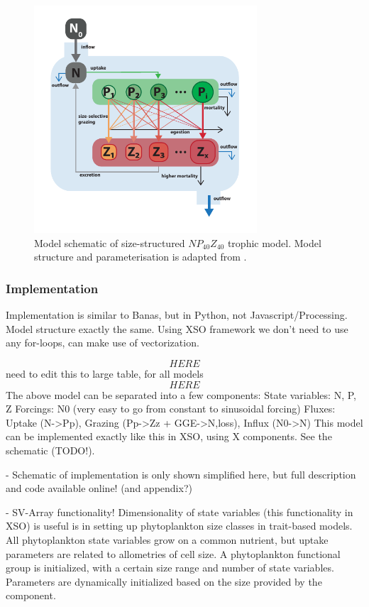 \documentclass[journal abbreviation, manuscript]{copernicus}
\begin{document}
\begin{figure}[t]
\includegraphics[width=8.3cm]{Figures/firstdraft_schematics/03_schematics_ASTroCAT.pdf}
\caption{Model schematic of size-structured $NP_{40}Z_{40}$ trophic model. Model structure and parameterisation is adapted from \citet{Banas2011b}.}
\label{Figure:ModelSchematics_3}
\end{figure}

\subsubsection{Implementation}
Implementation is similar to Banas, but in Python, not Javascript/Processing. Model structure exactly the same.
Using XSO framework we don't need to use any for-loops, can make use of vectorization.


$$HERE$$ need to edit this to large table, for all models $$HERE$$
The above model can be separated into a few components:
State variables: N, P, Z
Forcings: N0 (very easy to go from constant to sinusoidal forcing)
Fluxes: Uptake (N->Pp), Grazing (Pp->Zz + GGE->N,loss), Influx (N0->N)
This model can be implemented exactly like this in XSO, using X components. See the schematic (TODO!).

- Schematic of implementation is only shown simplified here, but full description and code available online! (and appendix?)

- SV-Array functionality! Dimensionality of state variables (this functionality in XSO) is useful is in setting up phytoplankton size classes in trait-based models. All phytoplankton state variables grow on a common nutrient, but uptake parameters are related to allometries of cell size. A phytoplankton functional group is initialized, with a certain size range and number of state variables. Parameters are dynamically initialized based on the size provided by the component. 
\end{document}
